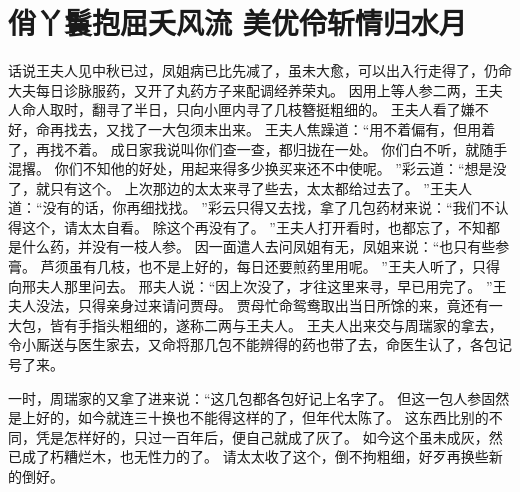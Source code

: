\chapter{俏丫鬟抱屈夭风流 \quad 美优伶斩情归水月}
\par
话说王夫人见中秋已过，凤姐病已比先减了，虽未大愈，可以出入行走得了，仍命大夫每日诊脉服药，又开了丸药方子来配调经养荣丸。
因用上等人参二两，王夫人命人取时，翻寻了半日，只向小匣内寻了几枝簪挺粗细的。
王夫人看了嫌不好，命再找去，又找了一大包须末出来。
王夫人焦躁道：“用不着偏有，但用着了，再找不着。
成日家我说叫你们查一查，都归拢在一处。
你们白不听，就随手混撂。
你们不知他的好处，用起来得多少换买来还不中使呢。
”彩云道：“想是没了，就只有这个。
上次那边的太太来寻了些去，太太都给过去了。
”王夫人道：“没有的话，你再细找找。
”彩云只得又去找，拿了几包药材来说：“我们不认得这个，请太太自看。
除这个再没有了。
”王夫人打开看时，也都忘了，不知都是什么药，并没有一枝人参。
因一面遣人去问凤姐有无，凤姐来说：“也只有些参膏。
芦须虽有几枝，也不是上好的，每日还要煎药里用呢。
”王夫人听了，只得向邢夫人那里问去。
邢夫人说：“因上次没了，才往这里来寻，早已用完了。
”王夫人没法，只得亲身过来请问贾母。
贾母忙命鸳鸯取出当日所馀的来，竟还有一大包，皆有手指头粗细的，遂称二两与王夫人。
王夫人出来交与周瑞家的拿去，令小厮送与医生家去，又命将那几包不能辨得的药也带了去，命医生认了，各包记号了来。
\par
一时，周瑞家的又拿了进来说：“这几包都各包好记上名字了。
但这一包人参固然是上好的，如今就连三十换也不能得这样的了，但年代太陈了。
这东西比别的不同，凭是怎样好的，只过一百年后，便自己就成了灰了。
如今这个虽未成灰，然已成了朽糟烂木，也无性力的了。
请太太收了这个，倒不拘粗细，好歹再换些新的倒好。
